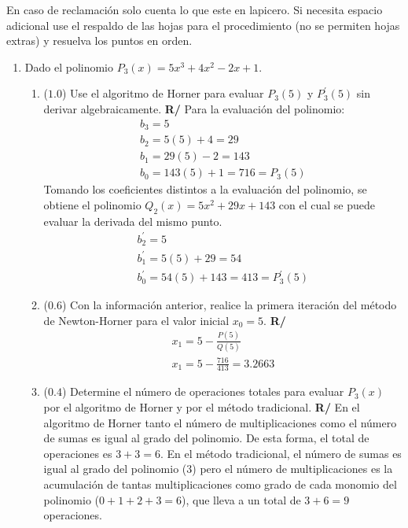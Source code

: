\documentclass[12pt]{article}
\begin{document}
En caso de reclamación solo cuenta lo que este en lapicero. %
Si necesita espacio adicional %
use el respaldo de las hojas para el procedimiento (no se permiten hojas extras) y resuelva los puntos en orden. %
\vspace{-.5cm}
  \begin{enumerate}[leftmargin=*,widest=9]
    \item Dado el polinomio \(P_3(x) = 5x^3 + 4x^2 -2x +1\).
   \begin{enumerate}[label=\alph*]
    \item (\(1.0\)) Use el algoritmo de Horner para evaluar \(P_3(5)\) y \(P_3^\prime(5)\) sin derivar algebraicamente.
    \textbf{R/}
    Para la evaluación del polinomio:
    \begin{eqnarray*}
    b_3 = 5\\
    b_2 = 5(5) + 4 = 29\\
    b_1 = 29(5) - 2 = 143\\
    b_0 = 143(5) + 1 = 716 = P_3(5)
    \end{eqnarray*}
    Tomando los coeficientes distintos a la evaluación del polinomio, se obtiene el polinomio \(Q_2(x) = 5x^2 +29x+143\) con el cual se puede evaluar la derivada del mismo punto.
    \begin{eqnarray*}
    b^{\prime}_2 = 5\\
    b^{\prime}_1 = 5(5) + 29 = 54\\
    b^{\prime}_0 = 54(5) + 143 = 413 = P_3^{\prime}(5)
    \end{eqnarray*}
    \item (\(0.6\)) Con la información anterior, realice la primera iteración del método de Newton-Horner para el valor inicial \(x_0=5\).
    \textbf{R/}
    \begin{eqnarray*}
    x_1 = 5 - \frac{P(5)}{Q(5)}\\
    x_1 = 5 - \frac{716}{413} = 3.2663
    \end{eqnarray*}
    \item (\(0.4\)) Determine el número de operaciones totales para evaluar \(P_3(x)\) por el algoritmo de Horner y por el método tradicional.
    \textbf{R/} En el algoritmo de Horner tanto el número de multiplicaciones como el número de sumas es igual al grado del polinomio. De esta forma, el total de operaciones es \(3+3=6\).
    En el método tradicional, el número de sumas es igual al grado del polinomio (\(3\)) pero el número de multiplicaciones es la acumulación de tantas multiplicaciones como grado de cada monomio del polinomio (\(0 + 1 + 2 + 3 = 6 \)), que lleva a un total de \(3+6=9\) operaciones.

\end{enumerate}
\end{enumerate}
\end{document}
